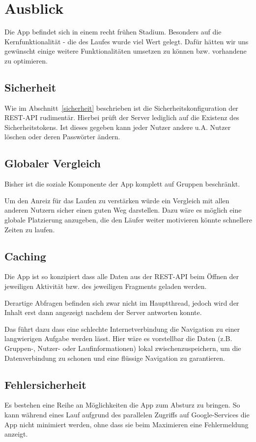 \section{Ausblick}\label{ausblick}
Die App befindet sich in einem recht frühen Stadium. Besonders auf die Kernfunktionalität - die des Laufes wurde viel Wert gelegt. Dafür hätten wir uns gewünscht einige weitere Funktionalitäten umsetzen zu können bzw. vorhandene zu optimieren. 
\subsection{Sicherheit}
Wie im Abschnitt~\ref{sicherheit} beschrieben ist die Sicherheitskonfiguration der REST-API rudimentär. Hierbei prüft der Server lediglich auf die Existenz des Sicherheitstokens. Ist dieses gegeben kann jeder Nutzer andere u.A. Nutzer löschen oder deren Passwörter ändern.

\subsection{Globaler Vergleich}
Bisher ist die soziale Komponente der App komplett auf Gruppen beschränkt.

Um den Anreiz für das Laufen zu verstärken würde ein Vergleich mit allen anderen Nutzern sicher einen guten Weg darstellen. Dazu wäre es möglich eine globale Platzierung anzugeben, die den Läufer weiter motivieren könnte schnellere Zeiten zu laufen.

\subsection{Caching}
Die App ist so konzipiert dass alle Daten aus der REST-API beim Öffnen der jeweiligen Aktivität bzw. des jeweiligen Fragments geladen werden. 

Derartige Abfragen befinden sich zwar nicht im Hauptthread, jedoch wird der Inhalt erst dann angezeigt nachdem der Server antworten konnte.

Das führt dazu dass eine schlechte Internetverbindung die Navigation zu einer langwierigen Aufgabe werden lässt. Hier wäre es vorstellbar die Daten (z.B. Gruppen-, Nutzer- oder Laufinformationen) lokal zwischenzuspeichern, um die Datenverbindung zu schonen und eine flüssige Navigation zu garantieren.

\subsection{Fehlersicherheit}
Es bestehen eine Reihe an Möglichkeiten die App zum Absturz zu bringen. So kann während eines Lauf aufgrund des parallelen Zugriffs auf Google-Services die App nicht minimiert werden, ohne dass sie beim Maximieren eine Fehlermeldung anzeigt.

